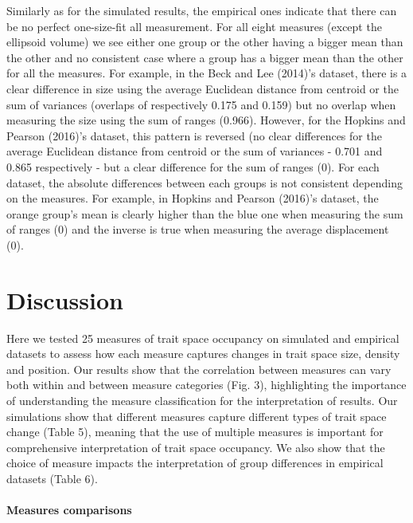\documentclass[]{article}
\let\oldparagraph\paragraph
\renewcommand{\paragraph}[1]{\oldparagraph{#1}\mbox{}}
\begin{document}
\renewcommand\baselinestretch{1.6}\selectfont

Similarly as for the simulated results, the empirical ones indicate that
there can be no perfect one-size-fit all measurement. For all eight
measures (except the ellipsoid volume) we see either one group or the
other having a bigger mean than the other and no consistent case where a
group has a bigger mean than the other for all the measures. For
example, in the Beck and Lee (2014)'s dataset, there is a clear
difference in size using the average Euclidean distance from centroid or
the sum of variances (overlaps of respectively 0.175 and 0.159) but no
overlap when measuring the size using the sum of ranges (0.966).
However, for the Hopkins and Pearson (2016)'s dataset, this pattern is
reversed (no clear differences for the average Euclidean distance from
centroid or the sum of variances - 0.701 and 0.865 respectively - but a
clear difference for the sum of ranges (0). For each dataset, the
absolute differences between each groups is not consistent depending on
the measures. For example, in Hopkins and Pearson (2016)'s dataset, the
orange group's mean is clearly higher than the blue one when measuring
the sum of ranges (0) and the inverse is true when measuring the average
displacement (0).

\section{Discussion}\label{discussion}

Here we tested 25 measures of trait space occupancy on simulated and
empirical datasets to assess how each measure captures changes in trait
space size, density and position. Our results show that the correlation
between measures can vary both within and between measure categories
(Fig. 3), highlighting the importance of understanding the measure
classification for the interpretation of results. Our simulations show
that different measures capture different types of trait space change
(Table 5), meaning that the use of multiple measures is important for
comprehensive interpretation of trait space occupancy. We also show that
the choice of measure impacts the interpretation of group differences in
empirical datasets (Table 6).

\paragraph{Measures comparisons}\label{measures-comparisons}
\end{document}
